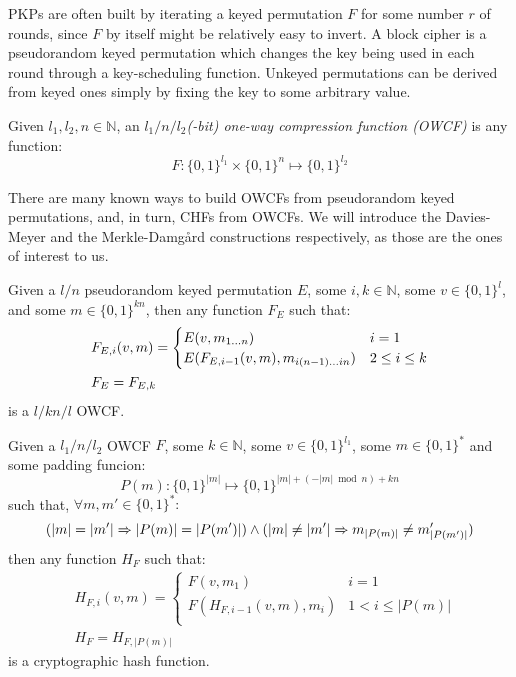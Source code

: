 \noindent PKPs are often built by iterating a keyed permutation \(F\) for some number \(r\) of
rounds, since \(F\) by itself might be relatively easy to invert.
A block cipher is a pseudorandom keyed permutation which changes the key being used in each
round through a key-scheduling function.
Unkeyed permutations can be derived from keyed ones simply by fixing the key to some arbitrary
value.
\begin{definition}
	Given \(l_1, l_2, n \in \mathbb{N}\), an \emph{\(l_1/n/l_2\)(-bit) one-way compression function
		(OWCF)}
	is any function:
	\[F\colon {\{0, 1\}}^{l_1} \times {\{0, 1\}}^n \mapsto {\{0, 1\}}^{l_2}\]
\end{definition}

\noindent There are many known ways to build OWCFs from pseudorandom keyed
permutations, and, in turn, CHFs from OWCFs.
We will introduce the Davies-Meyer and the Merkle-Damg\r{a}rd constructions respectively, as 
those are the ones of interest to us.
\begin{theorem}
	Given a \(l/n\) pseudorandom keyed permutation \(E\), some \(i, k \in \mathbb{N}\), some
	\(v \in {\{0, 1\}}^l\), and some \(m \in {\{0, 1\}}^{kn}\), then any function \(F_E\) such that:
	\begin{align*}
		 & F_{E,i}(v, m) =
		\begin{cases}
			E(v, m_{{{1}\dots{n}}})                      & i = 1         \\
			E(F_{E, i-1}(v, m), m_{{{i(n-1)}\dots{in}}}) & 2 \le i \le k \\
		\end{cases} \\
		 & F_E = F_{E, k}
	\end{align*}
	is a \(l/kn/l\) OWCF\@.
\end{theorem}
\begin{theorem}
	Given a \(l_1/n/l_2\) OWCF \(F\), some \(k \in \mathbb{N}\), some \(v \in {\{0, 1\}}^{l_1}\),
	some \(m \in {\{0, 1\}}^*\) and some padding funcion:
	\[P(m)\colon {\{0, 1\}}^{|m|} \mapsto {\{0, 1\}}^{|m| + (-|m| \bmod n) + kn}\]
	such that, \(\forall m, m' \in {\{0, 1\}}^*\colon \)
	\[(|m| = |m'| \Rightarrow |P(m)| = |P(m')|) \land (|m| \neq |m'| \Rightarrow m_{|P(m)|} \neq m'_{|P(m')|})\]
	then any function \(H_F\) such that:
	\begin{align*}
		 & H_{F, i}(v, m) =
		\begin{cases}
			F(v, m_1)                & i = 1            \\
			F(H_{F, i-1}(v, m), m_i) & 1 < i \le |P(m)| \\
		\end{cases} \\
		 & H_F = H_{F, |P(m)|}
	\end{align*}
	is a cryptographic hash function.
\end{theorem}
